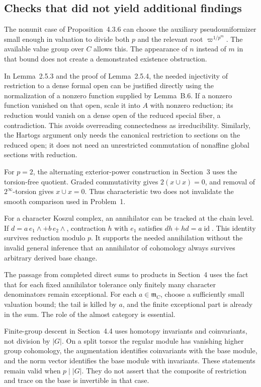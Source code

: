 \documentclass[10pt]{article}
\begin{document}
\subsection*{Checks that did not yield additional findings}
The nonunit case of Proposition 4.3.6 can choose the auxiliary pseudouniformizer small enough in valuation to divide both \(p\) and the relevant root \(\varpi^{1/p^m}\). The available value group over \(C\) allows this. The appearance of \(n\) instead of \(m\) in that bound does not create a demonstrated existence obstruction.\par
In Lemma 2.5.3 and the proof of Lemma 2.5.4, the needed injectivity of restriction to a dense formal open can be justified directly using the normalization of a nonzero function supplied by Lemma B.6. If a nonzero function vanished on that open, scale it into \(A\) with nonzero reduction; its reduction would vanish on a dense open of the reduced special fiber, a contradiction. This avoids overreading connectedness as irreducibility. Similarly, the Hartogs argument only needs the canonical restriction to sections on the reduced open; it does not need an unrestricted commutation of nonaffine global sections with reduction.\par
For \(p=2\), the alternating exterior-power construction in Section 3 uses the torsion-free quotient. Graded commutativity gives \(2(x\cup x)=0\), and removal of \(2^\infty\)-torsion gives \(x\cup x=0\). Thus characteristic two does not invalidate the smooth comparison used in Problem 1.\par
For a character Koszul complex, an annihilator can be tracked at the chain level. If \(d=a\,e_1\wedge+b\,e_2\wedge\), contraction \(h\) with \(e_1\) satisfies \(dh+hd=a\operatorname{id}\). This identity survives reduction modulo \(p\). It supports the needed annihilation without the invalid general inference that an annihilator of cohomology always survives arbitrary derived base change.\par
The passage from completed direct sums to products in Section 4 uses the fact that for each fixed annihilator tolerance only finitely many character denominators remain exceptional. For each \(a\in\mathfrak m_C\), choose a sufficiently small valuation bound; the tail is killed by \(a\), and the finite exceptional part is already in the sum. The role of the almost category is essential.\par
Finite-group descent in Section 4.4 uses homotopy invariants and coinvariants, not division by \(|G|\). On a split torsor the regular module has vanishing higher group cohomology, the augmentation identifies coinvariants with the base module, and the norm vector identifies the base module with invariants. These statements remain valid when \(p\mid |G|\). They do not assert that the composite of restriction and trace on the base is invertible in that case.\par
\end{document}
